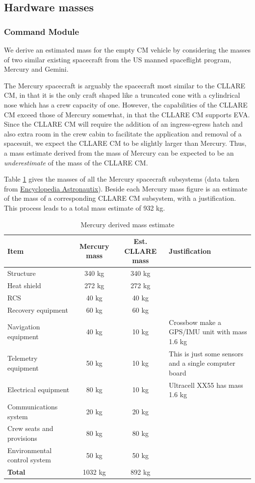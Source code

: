 \documentclass{report}
\begin{document}
\subsection{Hardware masses}

\subsubsection{Command Module}

We derive an estimated mass for the empty CM vehicle by considering the masses of two similar existing spacecraft from the US manned spaceflight program, Mercury and Gemini.

The Mercury spacecraft is arguably the spacecraft most similar to the CLLARE CM, in that it is the only craft shaped like a truncated cone with a cylindrical nose which has a crew capacity of one.  However, the capabilities of the CLLARE CM exceed those of Mercury somewhat, in that the CLLARE CM supports EVA.  Since the CLLARE CM will require the addition of an ingress-egress hatch and also extra room in the crew cabin to facilitate the application and removal of a spacesuit, we expect the CLLARE CM to be slightly larger than Mercury.  Thus, a mass estimate derived from the mass of Mercury can be expected to be an \emph{underestimate} of the mass of the CLLARE CM.

Table \ref{tab:mercurymass} gives the masses of all the Mercury spacecraft subsystems (data taken from \href{http://www.astronautix.com/craft/mercury.htm}{Encyclopedia Astronautix}).  Beside each Mercury mass figure is an estimate of the mass of a corresponding CLLARE CM subsystem, with a justification.  This process leads to a total mass estimate of 932 kg.
 
\begin{table}
\centering
\begin{tabular}{|l|c|c|l|}
\hline
Item	& Mercury mass & Est. CLLARE mass & Justification \\
\hline \hline
Structure		& 340 kg	& 340 kg & \\
Heat shield		& 272 kg	& 272 kg & \\
RCS			& 40 kg		& 40 kg & \\
Recovery equipment	& 60 kg		& 60 kg & \\
Navigation equipment	& 40 kg		& 10 kg & Crossbow make a GPS/IMU unit with mass 1.6 kg \\
Telemetry equipment	& 50 kg		& 10 kg & This is just some sensors and a single computer board \\
Electrical equipment	& 80 kg		& 10 kg & Ultracell XX55 has mass 1.6 kg \\
Communications system	& 20 kg		& 20 kg & \\
Crew seats and provisions & 80 kg	& 80 kg & \\
Environmental control system	& 50 kg		& 50 kg & \\
\hline \hline
\textbf{Total}	& 1032 kg & 892 kg	& \\
\hline
\end{tabular}
\caption{Mercury derived mass estimate}
\label{tab:mercurymass}
\end{table} 
\end{document}
